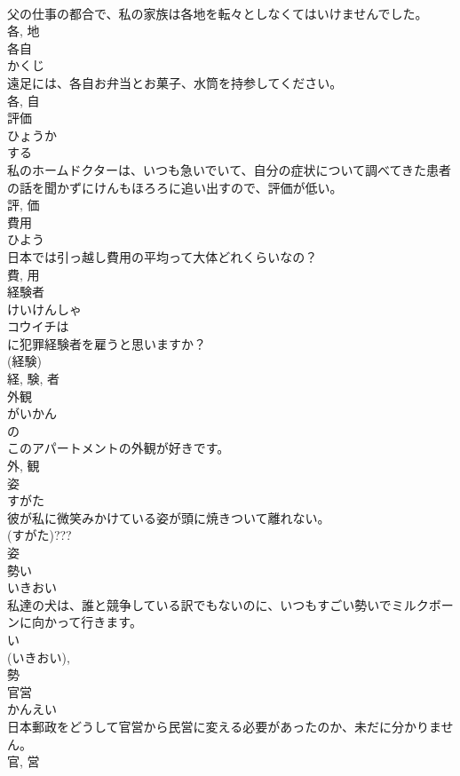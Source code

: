 \documentclass[8pt]{extreport}
\begin{document}
\begin{CJK}{UTF8}{min}
\\	父の仕事の都合で、私の家族は各地を転々としなくてはいけませんでした。	
\\	各, 地	
\\	各自	
\\	かくじ	
\\	遠足には、各自お弁当とお菓子、水筒を持参してください。	
\\	各, 自	
\\	評価	
\\	ひょうか	
\\	する 
\\	私のホームドクターは、いつも急いでいて、自分の症状について調べてきた患者の話を聞かずにけんもほろろに追い出すので、評価が低い。	
\\	評, 価	
\\	費用	
\\	ひよう	
\\	日本では引っ越し費用の平均って大体どれくらいなの？	
\\	費, 用	
\\	経験者	
\\	けいけんしゃ	
\\	コウイチは
\\	に犯罪経験者を雇うと思いますか？	
\\	(経験) 
\\	経, 験, 者	
\\	外観	
\\	がいかん	
\\	の 
\\	このアパートメントの外観が好きです。	
\\	外, 観	
\\	姿	
\\	すがた	
\\	彼が私に微笑みかけている姿が頭に焼きついて離れない。	
\\	(すがた)??? 
\\	姿	
\\	勢い	
\\	いきおい	
\\	私達の犬は、誰と競争している訳でもないのに、いつもすごい勢いでミルクボーンに向かって行きます。	
\\	い 
\\	(いきおい), 
\\	勢	
\\	官営	
\\	かんえい	
\\	日本郵政をどうして官営から民営に変える必要があったのか、未だに分かりません。	
\\	官, 営	

\end{CJK}
\end{document}
